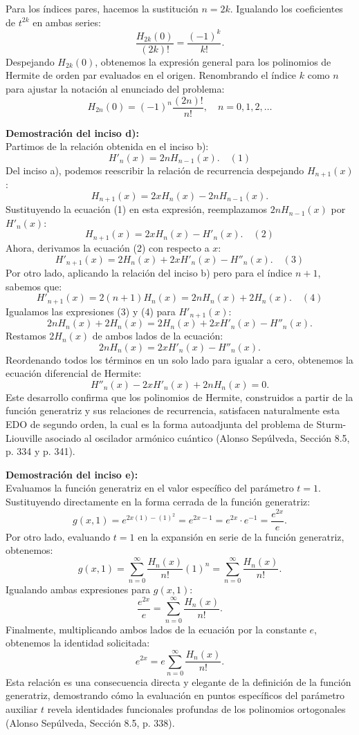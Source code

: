 \documentclass[a4paper]{article}
\begin{document}
Para los índices pares, hacemos la sustitución $n = 2k$. Igualando los coeficientes de $t^{2k}$ en ambas series:
$$
\frac{H_{2k}(0)}{(2k)!} = \frac{(-1)^k}{k!}.
$$
Despejando $H_{2k}(0)$, obtenemos la expresión general para los polinomios de Hermite de orden par evaluados en el origen. Renombrando el índice $k$ como $n$ para ajustar la notación al enunciado del problema:
$$
H_{2n}(0) = (-1)^n \frac{(2n)!}{n!}, \quad n = 0, 1, 2, \dots
$$

\vspace{0.3cm}
\noindent\textbf{Demostración del inciso d):} \\
Partimos de la relación obtenida en el inciso b):
$$
H'_n(x) = 2n H_{n-1}(x). \quad (1)
$$
Del inciso a), podemos reescribir la relación de recurrencia despejando $H_{n+1}(x)$:
$$
H_{n+1}(x) = 2x H_n(x) - 2n H_{n-1}(x).
$$
Sustituyendo la ecuación (1) en esta expresión, reemplazamos $2n H_{n-1}(x)$ por $H'_n(x)$:
$$
H_{n+1}(x) = 2x H_n(x) - H'_n(x). \quad (2)
$$
Ahora, derivamos la ecuación (2) con respecto a $x$:
$$
H'_{n+1}(x) = 2 H_n(x) + 2x H'_n(x) - H''_n(x). \quad (3)
$$
Por otro lado, aplicando la relación del inciso b) pero para el índice $n+1$, sabemos que:
$$
H'_{n+1}(x) = 2(n+1) H_n(x) = 2n H_n(x) + 2 H_n(x). \quad (4)
$$
Igualamos las expresiones (3) y (4) para $H'_{n+1}(x)$:
$$
2n H_n(x) + 2 H_n(x) = 2 H_n(x) + 2x H'_n(x) - H''_n(x).
$$
Restamos $2 H_n(x)$ de ambos lados de la ecuación:
$$
2n H_n(x) = 2x H'_n(x) - H''_n(x).
$$
Reordenando todos los términos en un solo lado para igualar a cero, obtenemos la ecuación diferencial de Hermite:
$$
H''_n(x) - 2x H'_n(x) + 2n H_n(x) = 0.
$$
Este desarrollo confirma que los polinomios de Hermite, construidos a partir de la función generatriz y sus relaciones de recurrencia, satisfacen naturalmente esta EDO de segundo orden, la cual es la forma autoadjunta del problema de Sturm-Liouville asociado al oscilador armónico cuántico (Alonso Sepúlveda, Sección 8.5, p. 334 y p. 341).

\vspace{0.3cm}
\noindent\textbf{Demostración del inciso e):} \\
Evaluamos la función generatriz en el valor específico del parámetro $t = 1$. Sustituyendo directamente en la forma cerrada de la función generatriz:
$$
g(x, 1) = e^{2x(1) - (1)^2} = e^{2x - 1} = e^{2x} \cdot e^{-1} = \frac{e^{2x}}{e}.
$$
Por otro lado, evaluando $t = 1$ en la expansión en serie de la función generatriz, obtenemos:
$$
g(x, 1) = \sum_{n=0}^{\infty} \frac{H_n(x)}{n!} (1)^n = \sum_{n=0}^{\infty} \frac{H_n(x)}{n!}.
$$
Igualando ambas expresiones para $g(x, 1)$:
$$
\frac{e^{2x}}{e} = \sum_{n=0}^{\infty} \frac{H_n(x)}{n!}.
$$
Finalmente, multiplicando ambos lados de la ecuación por la constante $e$, obtenemos la identidad solicitada:
$$
e^{2x} = e \sum_{n=0}^{\infty} \frac{H_n(x)}{n!}.
$$
Esta relación es una consecuencia directa y elegante de la definición de la función generatriz, demostrando cómo la evaluación en puntos específicos del parámetro auxiliar $t$ revela identidades funcionales profundas de los polinomios ortogonales (Alonso Sepúlveda, Sección 8.5, p. 338).
\end{document}
